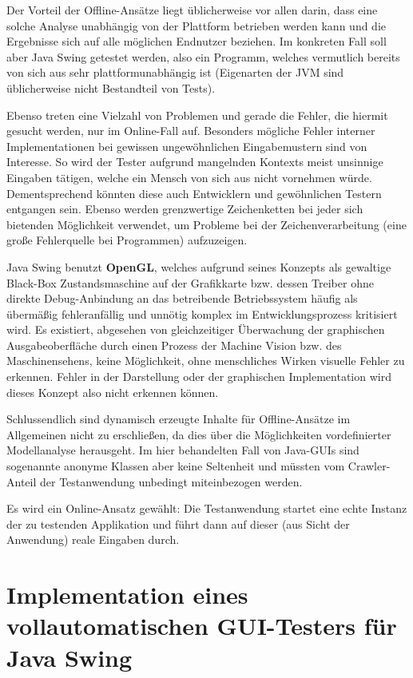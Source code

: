 Der Vorteil der Offline-Ansätze liegt üblicherweise vor allen darin, dass eine solche Analyse unabhängig von der
Plattform betrieben werden kann und die Ergebnisse sich auf alle möglichen Endnutzer beziehen.
Im konkreten Fall soll aber Java Swing getestet werden, also ein Programm, welches vermutlich
bereits von sich aus sehr plattformunabhängig ist (Eigenarten der JVM sind üblicherweise nicht
Bestandteil von Tests).

Ebenso treten eine Vielzahl von Problemen und gerade die Fehler, die hiermit gesucht werden,
nur im Online-Fall auf. Besonders mögliche Fehler interner Implementationen bei gewissen ungewöhnlichen
Eingabemustern sind von Interesse. So wird der Tester aufgrund mangelnden Kontexts meist unsinnige
Eingaben tätigen, welche ein Mensch von sich aus nicht vornehmen würde. Dementsprechend könnten
diese auch Entwicklern und gewöhnlichen Testern entgangen sein. Ebenso werden grenzwertige
Zeichenketten bei jeder sich bietenden Möglichkeit verwendet, um Probleme bei der Zeichenverarbeitung
(eine große Fehlerquelle bei Programmen) aufzuzeigen.

Java Swing benutzt \textbf{OpenGL}\label{openglQQ}, welches aufgrund seines Konzepts als gewaltige
Black-Box Zustandsmaschine auf der Grafikkarte bzw. dessen Treiber
ohne direkte Debug-Anbindung an das betreibende Betriebssystem
häufig als übermäßig fehleranfällig und unnötig komplex im Entwicklungsprozess kritisiert wird.
Es existiert, abgesehen von gleichzeitiger Überwachung der graphischen Ausgabeoberfläche
durch einen Prozess der \glqq{}Machine Vision\grqq{} bzw. des Maschinensehens, keine Möglichkeit,
ohne menschliches Wirken visuelle Fehler zu erkennen. Fehler in der Darstellung oder
der graphischen Implementation wird dieses Konzept also nicht erkennen können.

Schlussendlich sind dynamisch erzeugte Inhalte für Offline-Ansätze im Allgemeinen
nicht zu erschließen, da dies über die Möglichkeiten vordefinierter Modellanalyse herausgeht.
Im hier behandelten Fall von Java-GUIs sind sogenannte anonyme Klassen aber keine
Seltenheit und müssten vom Crawler-Anteil der Testanwendung unbedingt miteinbezogen werden.

Es wird ein Online-Ansatz gewählt: Die Testanwendung startet eine echte Instanz
der zu testenden Applikation und führt dann auf dieser (aus Sicht der Anwendung) reale
Eingaben durch.


\section{Implementation eines vollautomatischen GUI-Testers für Java Swing}\label{section:myfullautoguitest}


